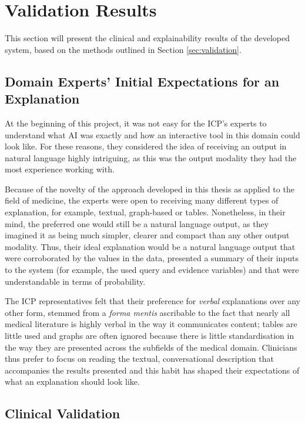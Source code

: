 \section{Validation Results} \label{sec:results-validation-results}
This section will present the clinical and explainability results of the developed system, based on the methods outlined in Section \ref{sec:validation}.

\subsection{Domain Experts' Initial Expectations for an Explanation} \label{subsec:domain-experts-initial-expectations}
At the beginning of this project, it was not easy for the ICP's experts to understand what AI was exactly and how an interactive tool in this domain could look like.
For these reasons, they considered the idea of receiving an output in natural language highly intriguing, as this was the output modality they had the most experience working with.

Because of the novelty of the approach developed in this thesis as applied to the field of medicine, the experts were open to receiving many different types of explanation, for example, textual, graph-based or tables.
Nonetheless, in their mind, the preferred one would still be a natural language output, as they imagined it as being much simpler, clearer and compact than any other output modality.
Thus, their ideal explanation would be a natural language output that were corroborated by the values in the data, presented a summary of their inputs to the system (for example, the used query and evidence variables) and that were understandable in terms of probability.

The ICP representatives felt that their preference for \textit{verbal} explanations over any other form, stemmed from a \textit{forma mentis} ascribable to the fact that nearly all medical literature is highly verbal in the way it communicates content; tables are little used and graphs are often ignored because there is little standardisation in the way they are presented across the subfields of the medical domain.
Clinicians thus prefer to focus on reading the textual, conversational description that accompanies the results presented and this habit has shaped their expectations of what an explanation should look like.

\subsection{Clinical Validation} \label{subsec:clinical-validation-results}
